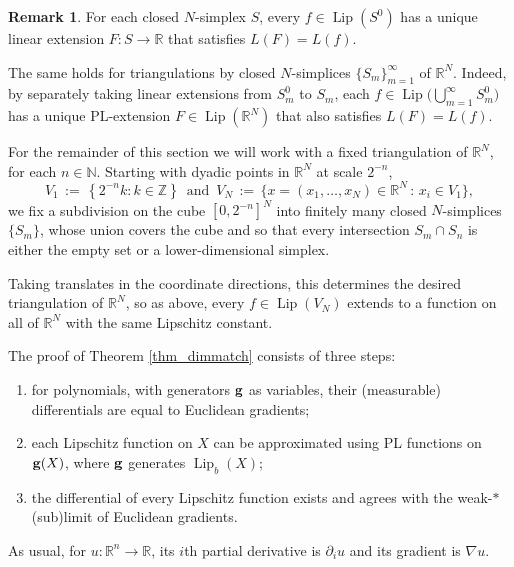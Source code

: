 \documentclass[reqno]{amsart}
\theoremstyle{plain}
\theoremstyle{definition}
\newtheorem{rmk}[thm]{Remark}
\theoremstyle{remark}
\numberwithin{equation}{section}
\newcommand{\Lip}{\operatorname{Lip}}
\newcommand{\N}{\mathbb{N}}
\newcommand{\R}{\mathbb{R}}
\begin{document}
\begin{rmk} \label{rmk_pl}
For each closed $N$-simplex $S$, every $f \in \Lip(S^0)$ has a unique linear extension $F : S \to \R$ that satisfies $L(F) = L(f)$.

The same holds for triangulations by closed $N$-simplices $\{S_m\}_{m=1}^\infty$ of $\R^N$.  Indeed, by separately taking linear extensions from $S_m^0$ to $S_m$, each $f \in \Lip\big(\bigcup_{m=1}^\infty S_m^0\big)$ has a unique PL-extension $F \in \Lip(\R^N)$ that also satisfies $L(F) = L(f)$.

For the remainder of this section we will work with a fixed triangulation of $\R^N$, for each $n \in \N$.  Starting with dyadic points in $\R^N$ at scale $2^{-n}$,
$$%
V_1 \,:=\, %
\left\{ 2^{-n}k : k \in \mathbb{Z} \right\} \, \text{ and } \, %
V_N \,:=\, %
\big\{ 
x = (x_1,\ldots,x_N) \in \R^N \,:\, 
x_i \in V_1
\big\},
$$%
we fix a subdivision on the cube $[0,2^{-n}]^N$ into finitely many closed $N$-simplices $\{S_m\}$, whose union covers the cube and so that every intersection $S_m \cap S_n$ is either the empty set or a lower-dimensional simplex.

Taking translates in the coordinate directions, this determines the desired triangulation of $\R^N$, so as above, every $f \in \Lip(V_N)$ extends to a function on all of $\R^N$ with the same Lipschitz constant.
\end{rmk}

The proof of Theorem \ref{thm_dimmatch} consists of three steps:
\begin{enumerate}
\vspace{.025in}
\item for polynomials, with generators ${\bf g}$ as variables, their (measurable) differentials are equal to Euclidean gradients;
\vspace{.025in}
\item each Lipschitz function on $X$ can be approximated using PL functions on ${\bf g}(X)$, where ${\bf g}$ generates $\Lip_b(X)$;
\vspace{.025in}
\item the differential of every Lipschitz function exists and agrees with the weak-$*$ (sub)limit of Euclidean gradients.
\end{enumerate}
As usual, for $u : \R^n \to \R$, its $i$th partial derivative is $\partial_iu$ and its gradient is $\nabla u$.
\end{document}
